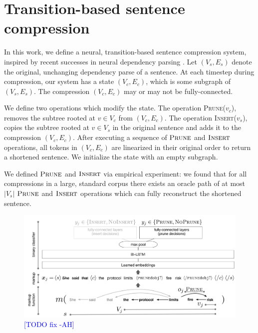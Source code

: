 \documentclass[11pt,a4paper]{article}
\newcommand{\rdep}[1]{\ $\xrightarrow{\text{\tiny #1}}$\ }
\newcommand{\ahcomment}[1]{\textcolor{blue}{[#1 -AH]}}
\begin{document}
\section{Transition-based sentence compression}\label{s:system}

In this work, we define a neural, transition-based sentence compression system, inspired by recent successes in neural dependency parsing \cite{D14-1082}. Let ${(V_s,E_s)}$ denote the original, unchanging dependency parse of a sentence. At each timestep during compression, our system has a state ${(V_c,E_c)}$, which is some subgraph of ${(V_s,E_s)}$. The compression ${(V_c,E_c)}$ may or may not be fully-connected. 

We define two operations which modify the state. The operation \textsc{Prune}($v_c$), removes the subtree rooted at $v \in V_c$ from ${(V_c,E_c)}$. The operation \textsc{Insert}($v_s$), copies the subtree rooted at $v \in V_s$ in the original sentence and adds it to the compression ${(V_c,E_c)}$. After executing a sequence of $\textsc{Prune}$ and $\textsc{Insert}$ operations, all tokens in ${(V_c,E_c)}$ are linearized in their original order to return a shortened sentence. We initialize the state with an empty subgraph. 

We defined $\textsc{Prune}$ and $\textsc{Insert}$ via empirical experiment: we found that for all compressions in a large, standard  corpus \cite{filippova2013overcoming} there exists an oracle path of at most $|V_s|$ $\textsc{Prune}$ and $\textsc{Insert}$ operations which can fully reconstruct the shortened sentence. 

\begin{figure}[htb!]
\centering
\includegraphics[width=.75\textwidth]{example.pdf}
\caption{\ahcomment{TODO fix} }
\label{f:example}
\end{figure}

\end{document}
